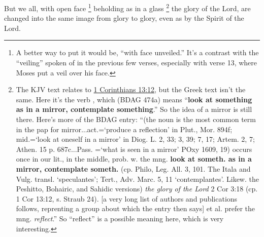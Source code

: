 			But we all, with open face%
			\footnote{%
				A better way to put it would be, ``with face unveiled.'' It's a contrast with the ``veiling'' spoken of in the previous few verses, especially with verse 13, where Moses put a veil over his face.
				}
			beholding as in a glass%
			\footnote{%
				The KJV text relates to \hyperref[1CORINTHIANS-13-12]{1 Corinthians 13:12}, but the Greek text isn't the same. Here it's the verb , which (BDAG 474a) means ``\textbf{look at something as in a mirror, contemplate something}.'' So the idea of a mirror is still there. Here's more of the BDAG entry: ``(the noun  is the most common term in the pap for mirror...act.=`produce a reflection' in Plut., Mor. 894f; mid.=`look at oneself in a mirror' in Diog. L. 2, 33; 3, 39; 7, 17; Artem. 2, 7; Athen. 15 p. 687c...Pass. =`what is seen in a mirror' POxy 1609, 19) occurs once in our lit., in the middle, prob. w. the mng. \textbf{look at someth. as in a mirror, contemplate someth.} (cp. Philo, Leg. All. 3, 101. The Itala and Vulg. transl. `speculantes'; Tert., Adv. Marc. 5, 11 `contemplantes'. Likew. the Peshitto, Bohairic, and Sahidic versions)  \textit{the glory of the Lord} 2 Cor 3:18 (cp. 1 Cor 13:12, s. Straub 24). [a very long list of authors and publications follows, reprenting a group about which the entry then says] et al. prefer the mng. \textit{reflect}.'' So ``reflect'' is a possible meaning here, which is very interesting.
				}
			the glory of the Lord, are changed into the same image from glory to glory, even as by the Spirit of the Lord.

			\begin{framed}
			\scriptsize
				\begin{compactdesc}
					\item[SBLG] 
				\end{compactdesc}
			\end{framed}

